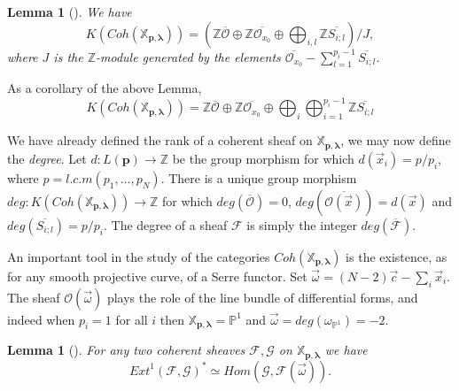 \documentclass[a4paper,10pt]{amsart}
\def\Z{\mathbb{Z}}
\def\O{\mathcal{O}}
\def\p{\mathbf{p}}
\def\xpl{\mathbb{X}_{\mathbf{p},\boldsymbol{\lambda}}}
\newtheorem{lem}[theo]{Lemma}
\numberwithin{equation}{section}
\begin{document}
{\vspace{.1in}

\begin{lem}[\cite{GL}]\label{L:grothxpl} We have
$$K(Coh(\xpl))=\left(\Z\overline{\O} \oplus \Z \overline{\O_{x_0}} \oplus \bigoplus_{i,l} \Z \overline{S_{i;l}}\right)/J,$$
where $J$ is the $\Z$-module generated by the elements $\overline{\O_{x_0}}-
\sum_{l=1}^{p_i-1}\overline{S_{i;l}}$.
\end{lem}

\vspace{.1in}

As a corollary of the above Lemma,
\begin{equation}\label{E:Grthth}
K(Coh(\xpl))=\Z\overline{\O} \oplus \Z \overline{\O_{x_0}} \oplus \bigoplus_{i}\bigoplus_{i=1}^{p_i-1} \Z \overline{S_{i;l}}
\end{equation}

\vspace{.1in}

We have already defined the rank of a coherent sheaf on $\xpl$, we may now define the \textit{degree}. Let $d: L(\p) \to \Z$ be the group morphism for which $d(\vec{x}_i)=p/p_i$, where $p=l.c.m (p_1, \ldots, p_N)$. There is a unique group morphism $deg: K(Coh(\xpl)) \to \Z$ for which $deg(\overline{\O})=0$, $deg(\overline{\O(\vec{x})})=d(\vec{x})$ and $deg(\overline{S_{i;l}})=p/p_i$. The degree of a sheaf $\mathcal{F}$ is simply the integer $deg(\overline{\mathcal{F}})$.

\vspace{.15in}

An important tool in the study of the categories $Coh(\xpl)$ is the existence, as for any smooth projective curve, of a Serre functor.
Set $\vec{\omega}= (N-2)\vec{c}-\sum_i \vec{x}_i$. The sheaf $\O(\vec{\omega})$ plays the role of the line bundle of differential forms, and indeed when $p_i=1$ for all $i$ then $\xpl=\mathbb{P}^1$ and $\vec{\omega}=deg(\omega_{\mathbb{P}^1})=-2$.

\vspace{.1in}

\begin{lem}[\cite{GL}]\label{L:Serredualxpl} For any two coherent sheaves $\mathcal{F},\mathcal{G}$ on $\xpl$ we have
\begin{equation}\label{E:Serredualityxpl}
{Ext}^1(\mathcal{F},\mathcal{G})^* \simeq {Hom}(\mathcal{G}, \mathcal{F}(\vec{\omega})).
\end{equation}
\end{lem}

}
\end{document}
